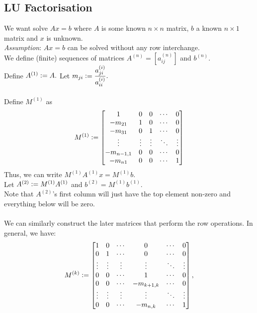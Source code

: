 \documentclass[12pt]{article}
\theoremstyle{definition}
\begin{document}
\subsection{LU Factorisation}

	We want solve $Ax = b$ where $A$ is some known $n\times n$ matrix, $b$ a known $n\times1$ matrix and $x$ is unknown.\\
	\emph{Assumption}: $Ax = b$ can be solved without any row interchange.\\
	We define (finite) sequences of matrices $A^{(n)} = [a^{(n)}_{ij}]$ and $b^{(n)}.$ \\
	Define $A^{(1)} \vcentcolon= A.$ Let $m_{ji} \vcentcolon= \dfrac{a^{(i)}_{ji}}{a^{(i)}_{ii}}.$\\~\\
	Define $M^{(1)}$ as
	\[M^{(1)} \vcentcolon= 
	\begin{bmatrix}
		1 & 0 & 0 & \cdots & 0\\
		-m_{21} & 1 & 0 & \cdots & 0\\
		-m_{31} & 0 & 1 & \cdots & 0\\
		\vdots & \vdots & \vdots & \ddots & \vdots\\
		-m_{n-1, 1} & 0 & 0 & \cdots & 0\\
		-m_{n1} & 0 & 0 & \cdots & 1\\
	\end{bmatrix}\]
	Thus, we can write $M^{(1)}A^{(1)}x = M^{(1)}b.$\\
	Let $A^{(2)} \vcentcolon= M^{(1)}A^{(1)}$ and $b^{(2)} = M^{(1)}b^{(1)}.$\\
	Note that $A^{(2)}$'s first column will just have the top element non-zero and everything below will be zero.\\~\\
	We can similarly construct the later matrices that perform the row operations. In general, we have:
	\[M^{(k)} \vcentcolon= 
	\begin{bmatrix}
		1 & 0 & \cdots & 0 & \cdots & 0\\
		0 & 1 & \cdots & 0 & \cdots & 0\\
		\vdots & \vdots & \vdots & \vdots & \ddots & \vdots\\
		0 & 0 & \cdots & 1 & \cdots & 0\\
		0 & 0 & \cdots & -m_{k+1, k} & \cdots & 0\\
		\vdots & \vdots & \vdots & \vdots & \ddots & \vdots\\
		0 & 0 & \cdots & -m_{n, k} & \cdots & 1\\
	\end{bmatrix},\]
\end{document}
